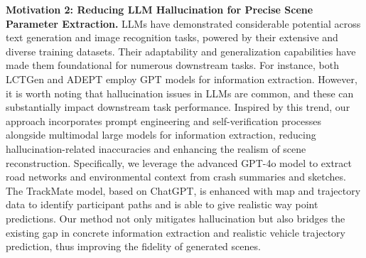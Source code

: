 
\textbf{Motivation 2: Reducing LLM Hallucination for Precise Scene Parameter Extraction.} LLMs have demonstrated considerable potential across text generation and image recognition tasks, powered by their extensive and diverse training datasets. Their adaptability and generalization capabilities have made them foundational for numerous downstream tasks. For instance, both LCTGen and ADEPT employ GPT models for information extraction. However, it is worth noting that hallucination issues in LLMs are common, and these can substantially impact downstream task performance. 
Inspired by this trend, our approach incorporates prompt engineering and self-verification processes alongside multimodal large models for information extraction, reducing hallucination-related inaccuracies and enhancing the realism of scene reconstruction. Specifically, we leverage the advanced GPT-4o model to extract road networks and environmental context from crash summaries and sketches. The TrackMate model, based on ChatGPT, is enhanced with map and trajectory data to identify participant paths and is able to give realistic way point predictions. Our method not only mitigates hallucination but also bridges the existing gap in concrete information extraction and realistic vehicle trajectory prediction, thus improving the fidelity of generated scenes.
